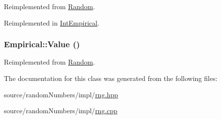 Reimplemented from \hyperlink{classRandom_22b2951acd2008e8ff58fae434ab7ac5}{Random}.

Reimplemented in \hyperlink{classIntEmpirical_d7e809689f9158c050b8a386eb945636}{IntEmpirical}.\hypertarget{classEmpirical_76b4c62b6fdcfbe2dbaff2462e4153ad}{
\subsubsection[{Value}]{ Empirical::Value ()}}
\label{classEmpirical_76b4c62b6fdcfbe2dbaff2462e4153ad}




Reimplemented from \hyperlink{classRandom_4d1c2876c5c78104186e241209d0e11e}{Random}.

The documentation for this class was generated from the following files:\begin{CompactItemize}
\item 
source/randomNumbers/impl/\hyperlink{rng_8hpp}{rng.hpp}\item 
source/randomNumbers/impl/\hyperlink{rng_8cpp}{rng.cpp}\end{CompactItemize}
